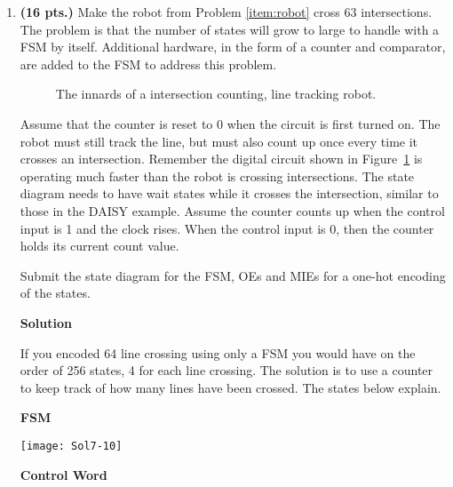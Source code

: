 \begin{enumerate}
    \item \textbf{ (16 pts.)}
        Make the robot from Problem \ref{item:robot} cross 63 intersections.
        The problem is that the number of states will grow to large to handle
        with a FSM by itself.  Additional hardware, in the form of a counter
        and comparator, are added to the FSM to address this problem.

        \begin{figure}[ht]
            \caption{The innards of a intersection counting, line tracking robot.}
            \label{fig:linecounter}
        \end{figure}

        Assume that the counter is reset to 0 when the circuit
        is first turned on.  The robot must still track the line, but
        must also count up once every time it crosses an intersection.  Remember
        the digital circuit shown in Figure~\ref{fig:linecounter} is
        operating much faster than the robot is crossing intersections.
        \filbreak
        The state diagram needs to have wait states while it crosses
        the intersection, similar to those
        in the DAISY example.  Assume the counter counts up
        when the control input is 1 and the clock rises.  When the control
        input is 0, then the counter holds its current count value.

        Submit the state diagram for the FSM, OEs and MIEs for a one-hot
        encoding of the states.

        \begin{onlysolution}  \textbf{Solution} \itshape{
                If you encoded 64 line crossing using only a FSM you would have
                on the order of 256 states, 4 for each line crossing.  The solution
                is to use a counter to keep track of how many lines have been crossed.
                The states below explain.

                \textbf{FSM}

                \texttt{[image: Sol7-10]}

                \filbreak
                \textbf{ Control Word}

}
\end{onlysolution}
\end{enumerate}

